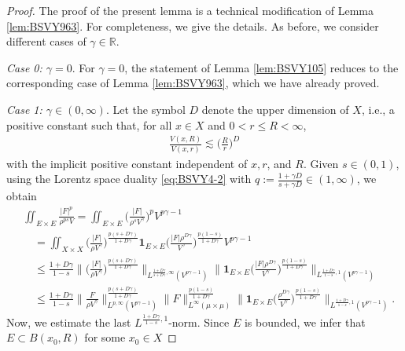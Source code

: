 \documentclass[10pt,a4paper]{amsart}
\newcommand{\BNorm}[2]{\Big\|#1\Big\|_{#2}}
\newcommand{\Norm}[2]{\|#1\|_{#2}}
\begin{document}
\begin{proof}
The proof of the present lemma is a technical modification of Lemma \ref{lem:BSVY963}. For
completeness, we give the details. As before, we consider different cases of
$\gamma\in\mathbb{R}$.

\emph{Case 0: $\gamma=0$}. For $\gamma=0$, the statement of Lemma \ref{lem:BSVY105} reduces
to the corresponding case of Lemma \ref{lem:BSVY963}, which we have already proved.

\emph{Case 1: $\gamma\in(0,\infty)$}. Let the symbol $D$ denote the upper dimension
of $X$, i.e., a positive constant such that, for all $x\in X$ and $0<r\le R<\infty$,
\begin{align}\label{eq:db}
\frac{V(x,R)}{V(x,r)}\lesssim \Big(\frac{R}{r}\Big)^D
\end{align}
with the implicit positive constant independent of $x,r$, and $R$.
Given $s\in(0,1)$, using the Lorentz space duality \eqref{eq:BSVY4-2} with $q:=
\frac{1+\gamma D}{s+\gamma D}\in (1,\infty)$, we obtain
\begin{equation}\label{eq:BSVY-v2}
\begin{split}
&\iint_{E\times E}\frac{|F|^p}{\rho^{ps}V}%
=\iint_{E\times E}\Big(\frac{|F|}{\rho^{s}V^\gamma}\Big)^pV^{p\gamma-1}    \\
&\quad=\iint_{X\times X}\Big(\frac{|F|}{\rho V^\gamma}\Big)^{\frac{p(s+D\gamma)}{1+D\gamma}}
\mathbf{1}_{E\times E}\Big(\frac{|F|
\rho^{D\gamma}}{V^\gamma}\Big)^{\frac{p(1-s)}{1+D\gamma}}
V^{p\gamma-1}\\
&\quad\le \frac{1+D\gamma}{1-s}
\BNorm{\Big(\frac{|F|}{\rho V^\gamma}\Big)^{\frac{p(s+D\gamma)}{1+D\gamma}}}{
L^{\frac{1+D\gamma}{s+D\gamma},\infty} (V^{p\gamma-1})} %
\BNorm{\mathbf{1}_{E\times E}\Big(\frac{|F|
\rho^{D\gamma}}{V^\gamma}\Big)^{\frac{p(1-s)}{1+D\gamma}}}{
L^{\frac{1+D\gamma}{1-s},1} (V^{p\gamma-1})}\\
&\quad\le \frac{1+D\gamma}{1-s}
\BNorm{\frac{F}{\rho V^\gamma}}{
L^{p,\infty}
(V^{p\gamma-1})}^{\frac{p(s+D\gamma)}{1+D\gamma}}\Norm{F}{L^\infty(\mu\times\mu)}
^{\frac{p(1-s)}{1+D\gamma}} %
\BNorm{\mathbf{1}_{E\times
E}\Big(\frac{\rho^{D\gamma}}{V^\gamma}\Big)^{\frac{p(1-s)}{1+D\gamma}}}{
L^{\frac{1+D\gamma}{1-s},1} (V^{p\gamma-1})}.
\end{split}
\end{equation}
Now, we estimate the last $L^{\frac{1+D\gamma}{1-s},1}$-norm.
Since $E$ is bounded, we infer that $E\subset B(x_0,R)$ for some $x_0\in X$

\end{proof}
\end{document}
